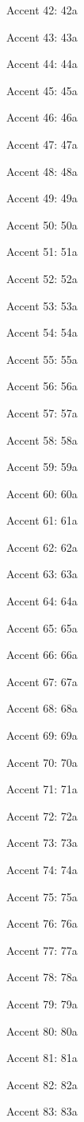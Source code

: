 Accent 42: \accent42a

Accent 43: \accent43a

Accent 44: \accent44a

Accent 45: \accent45a

Accent 46: \accent46a

Accent 47: \accent47a

Accent 48: \accent48a

Accent 49: \accent49a

Accent 50: \accent50a

Accent 51: \accent51a

Accent 52: \accent52a

Accent 53: \accent53a

Accent 54: \accent54a

Accent 55: \accent55a

Accent 56: \accent56a

Accent 57: \accent57a

Accent 58: \accent58a

Accent 59: \accent59a

Accent 60: \accent60a

Accent 61: \accent61a

Accent 62: \accent62a

Accent 63: \accent63a

Accent 64: \accent64a

Accent 65: \accent65a

Accent 66: \accent66a

Accent 67: \accent67a

Accent 68: \accent68a

Accent 69: \accent69a

Accent 70: \accent70a

Accent 71: \accent71a

Accent 72: \accent72a

Accent 73: \accent73a

Accent 74: \accent74a

Accent 75: \accent75a

Accent 76: \accent76a

Accent 77: \accent77a

Accent 78: \accent78a

Accent 79: \accent79a

Accent 80: \accent80a

Accent 81: \accent81a

Accent 82: \accent82a

Accent 83: \accent83a


